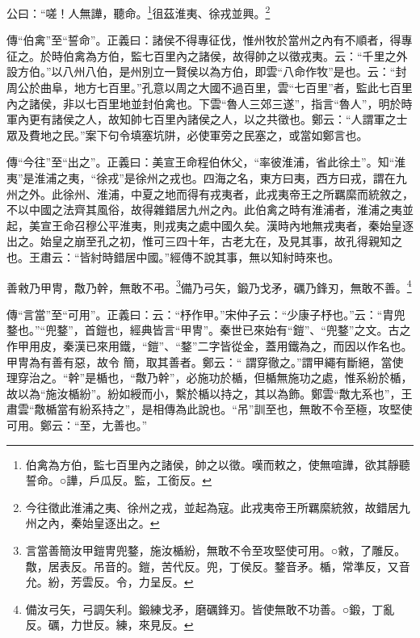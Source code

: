 公曰：“嗟！人無譁，聽命。\footnote{伯禽為方伯，監七百里內之諸侯，帥之以徵。嘆而敕之，使無喧譁，欲其靜聽誓命。○譁，戶瓜反。監，工銜反。}徂茲淮夷、徐戎並興。\footnote{今往徵此淮浦之夷、徐州之戎，並起為寇。此戎夷帝王所羈縻統敘，故錯居九州之內，秦始皇逐出之。}


{\noindent\zhuan{}\fzbyks 傳“伯禽”至“誓命”。正義曰：諸侯不得專征伐，惟州牧於當州之內有不順者，得專征之。於時伯禽為方伯，監七百里內之諸侯，故得帥之以徵戎夷。云：“千里之外設方伯。”以八州八伯，是州別立一賢侯以為方伯，即雲“八命作牧”是也。云：“封周公於曲阜，地方七百里。”孔意以周之大國不過百里，雲“七百里”者，監此七百里內之諸侯，非以七百里地並封伯禽也。下雲“魯人三郊三遂”，指言“魯人”，明於時軍內更有諸侯之人，故知帥七百里內諸侯之人，以之共徵也。鄭云：“人謂軍之士眾及費地之民。”案下句令填塞坑阱，必使軍旁之民塞之，或當如鄭言也。 \par}

{\noindent\zhuan{}\fzbyks 傳“今往”至“出之”。正義曰：美宣王命程伯休父，“率彼淮浦，省此徐土”。知“淮夷”是淮浦之夷，“徐戎”是徐州之戎也。四海之名，東方曰夷，西方曰戎，謂在九州之外。此徐州、淮浦，中夏之地而得有戎夷者，此戎夷帝王之所羈縻而統敘之，不以中國之法齊其風俗，故得雜錯居九州之內。此伯禽之時有淮浦者，淮浦之夷並起，美宣王命召穆公平淮夷，則戎夷之處中國久矣。漢時內地無戎夷者，秦始皇逐出之。始皇之崩至孔之初，惟可三四十年，古老尢在，及見其事，故孔得親知之也。王肅云：“皆紂時錯居中國。”經傳不說其事，無以知紂時來也。 \par}

善敹乃甲冑，敿乃幹，無敢不弔。\footnote{言當善簡汝甲鎧冑兜鍪，施汝楯紛，無敢不令至攻堅使可用。○敹，了雕反。敿，居表反。吊音的。鎧，苦代反。兜，丁侯反。鍪音矛。楯，常準反，又音允。紛，芳雲反。令，力呈反。}備乃弓矢，鍛乃戈矛，礪乃鋒刃，無敢不善。\footnote{備汝弓矢，弓調矢利。鍛練戈矛，磨礪鋒刃。皆使無敢不功善。○鍛，丁亂反。礪，力世反。練，來見反。}

{\noindent\zhuan{}\fzbyks 傳“言當”至“可用”。正義曰：云：“杼作甲。”宋仲子云：“少康子杼也。”云：“胄兜鍪也。”“兜鍪”，首鎧也，經典皆言“甲冑”。秦世已來始有“鎧”、“兜鍪”之文。古之作甲用皮，秦漢已來用鐵，“鎧”、“鍪”二字皆從金，蓋用鐵為之，而因以作名也。甲冑為有善有惡，故令 簡，取其善者。鄭云：“ 謂穿徹之。”謂甲繩有斷絕，當使 理穿治之。“幹”是楯也，“敿乃幹”，必施功於楯，但楯無施功之處，惟系紛於楯，故以為“施汝楯紛”。紛如綬而小，繫於楯以持之，其以為飾。鄭雲“敿尢系也”，王肅雲“敿楯當有紛系持之”，是相傳為此說也。“吊”訓至也，無敢不令至極，攻堅使可用。鄭云：“至，尢善也。” \par}

